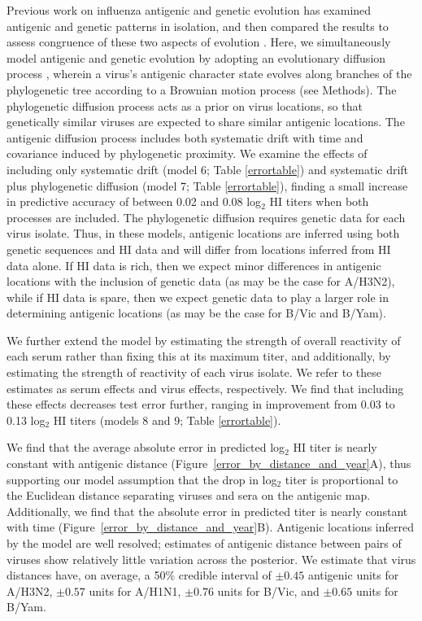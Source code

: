 \documentclass[11pt,oneside,letterpaper]{article}
\begin{document}
Previous work on influenza antigenic and genetic evolution has examined antigenic and genetic patterns in isolation, and then compared the results to assess congruence of these two aspects of evolution \cite{Hay01, Smith04, Russell08}. 
Here, we simultaneously model antigenic and genetic evolution by adopting an evolutionary diffusion process \cite{Lemey10}, wherein a virus's antigenic character state evolves along branches of the phylogenetic tree according to a Brownian motion process (see Methods).
The phylogenetic diffusion process acts as a prior on virus locations, so that genetically similar viruses are expected to share similar antigenic locations.
The antigenic diffusion process includes both systematic drift with time and covariance induced by phylogenetic proximity.
We examine the effects of including only systematic drift (model 6; Table \ref{errortable}) and systematic drift plus phylogenetic diffusion (model 7; Table \ref{errortable}), finding a small increase in predictive accuracy of between 0.02 and 0.08 log$_2$ HI titers when both processes are included.
The phylogenetic diffusion requires genetic data for each virus isolate.
Thus, in these models, antigenic locations are inferred using both genetic sequences and HI data and will differ from locations inferred from HI data alone.
If HI data is rich, then we expect minor differences in antigenic locations with the inclusion of genetic data (as may be the case for A/H3N2), while if HI data is spare, then we expect genetic data to play a larger role in determining antigenic locations (as may be the case for B/Vic and B/Yam).

We further extend the model by estimating the strength of overall reactivity of each serum rather than fixing this at its maximum titer, and additionally, by estimating the strength of reactivity of each virus isolate.
We refer to these estimates as serum effects and virus effects, respectively.
We find that including these effects decreases test error further, ranging in improvement from 0.03 to 0.13 log$_2$ HI titers (models 8 and 9; Table \ref{errortable}).

We find that the average absolute error in predicted log$_2$ HI titer is nearly constant with antigenic distance (Figure~\ref{error_by_distance_and_year}A), thus supporting our model assumption that the drop in log$_2$ titer is proportional to the Euclidean distance separating viruses and sera on the antigenic map.
Additionally, we find that the absolute error in predicted titer is nearly constant with time (Figure~\ref{error_by_distance_and_year}B).
Antigenic locations inferred by the model are well resolved; estimates of antigenic distance between pairs of viruses show relatively little variation across the posterior.
We estimate that virus distances have, on average, a 50\% credible interval of $\pm0.45$ antigenic units for A/H3N2, $\pm0.57$ units for A/H1N1, $\pm0.76$ units for B/Vic, and $\pm0.65$ units for B/Yam.
\end{document}
